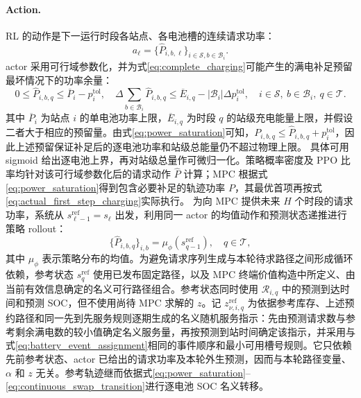 \documentclass[12pt,a4paper,UTF8]{ctexart}
\begin{document}
\paragraph{Action.}
RL 的动作是下一运行时段各站点、各电池槽的连续请求功率：
\begin{equation}
a_\ell=
\{\widehat P_{i,b,\ell}\}_{i\in\mathcal S,b\in\mathcal B_i}.
\label{eq:rl_action}
\end{equation}
actor 采用可行域参数化，并为式\eqref{eq:complete_charging}可能产生的满电补足预留最坏情况下的功率余量：
\begin{equation}
0\le\widehat P_{i,b,q}\le\overline P_i-p_i^{\mathrm{tol}},
\quad
\Delta\sum_{b\in\mathcal B_i}\widehat P_{i,b,q}
\le\overline E_{i,q}-|\mathcal B_i|\Delta p_i^{\mathrm{tol}},
\quad i\in\mathcal S,\ b\in\mathcal B_i,\ q\in\mathcal T.
\label{eq:rl_action_projection}
\end{equation}
其中 $\overline P_i$ 为站点 $i$ 的单电池功率上限，$\overline E_{i,q}$ 为时段 $q$ 的站级充电能量上限，并假设二者大于相应的预留量。由式\eqref{eq:power_saturation}可知，$P_{i,b,q}\le\widehat P_{i,b,q}+p_i^{\mathrm{tol}}$，因此上述预留保证补足后的逐电池功率和站级总能量仍不超过物理上限。
具体可用 sigmoid 给出逐电池上界，再对站级总量作可微归一化。策略概率密度及 PPO 比率均针对该可行域参数化后的请求动作 $\widehat P$ 计算；MPC 根据式\eqref{eq:power_saturation}得到包含必要补足的轨迹功率 $P$，其最优首项再按式\eqref{eq:actual_first_step_charging}实际执行。
为向 MPC 提供未来 $H$ 个时段的请求功率，系统从
$s_{\ell-1}^{\mathrm{ref}}=s_\ell$ 出发，利用同一 actor 的均值动作和预测状态递推进行策略 rollout：
\begin{equation}
\{\widehat P_{i,b,q}\}_{i,b}
=
\mu_\phi(s_{q-1}^{\mathrm{ref}}),
\quad q\in\mathcal T,
\label{eq:rl_power_rollout}
\end{equation}
其中 $\mu_\phi$ 表示策略分布的均值。为避免请求序列生成与本轮待求路径之间形成循环依赖，参考状态 $s_{q}^{\mathrm{ref}}$ 使用已发布固定路径，以及 MPC 终端价值构造中所定义、由当前有效信息确定的名义可行路径组合。参考状态同时使用 $\mathcal R_{i,q}$ 中的预测到达时间和预测 SOC，但不使用尚待 MPC 求解的 $z$。记 $z_{\nu,i,q}^{\mathrm{ref}}$ 为依据参考库存、上述预约路径和同一先到先服务规则逐期生成的名义随机服务指示：先由预测请求数与参考剩余满电数的较小值确定名义服务量，再按预测到站时间确定该指示，并采用与式\eqref{eq:battery_event_assignment}相同的事件顺序和最小可用槽号规则。它只依赖先前参考状态、actor 已给出的请求功率及本轮外生预测，因而与本轮路径变量、$\alpha$ 和 $z$ 无关。参考轨迹继而依据式\eqref{eq:power_saturation}--\eqref{eq:continuous_swap_transition}进行逐电池 SOC 名义转移。
\end{document}
